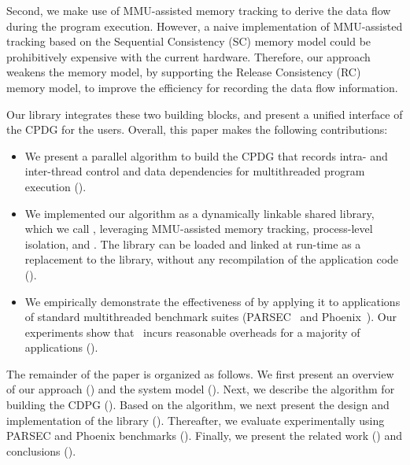 Second, we make use of MMU-assisted memory tracking to derive the data flow during the program execution. However, a naive implementation of MMU-assisted tracking based on the Sequential Consistency (SC) memory model could be prohibitively expensive with the current hardware. Therefore,  our approach weakens the memory model, by supporting the Release Consistency (RC) memory model, to improve the efficiency for recording the data flow information.

Our library integrates these two building blocks, and present a unified interface of the CPDG for the users. Overall, this paper makes the following contributions:

\begin{itemize} 
\item We present a parallel algorithm to build the CPDG that records intra- and inter-thread control and data dependencies for multithreaded program execution ().

\item We implemented our algorithm as a dynamically linkable shared library, which we call \projecttitle, leveraging MMU-assisted memory tracking, process-level isolation, and \intelpt.  The \projecttitle library can be loaded and linked at run-time as a replacement to the \pthreads library, without any recompilation  of the application code ().

\item We  empirically demonstrate  the effectiveness of \projecttitle by applying it to applications of standard multithreaded benchmark suites (PARSEC~\cite{parsec} and Phoenix~\cite{phoenix}). Our experiments show that \projecttitle~incurs reasonable overheads for a majority of applications (). 



\end{itemize}


The remainder of the paper is organized as follows. We first present  an overview of our approach () and the system model (). Next, we describe the algorithm for building the CDPG (). Based on the algorithm, we next present the design and implementation of  the \projecttitle library  (). Thereafter, we evaluate \projecttitle experimentally using PARSEC and Phoenix benchmarks (). 
Finally, we present the related work () and conclusions ().
